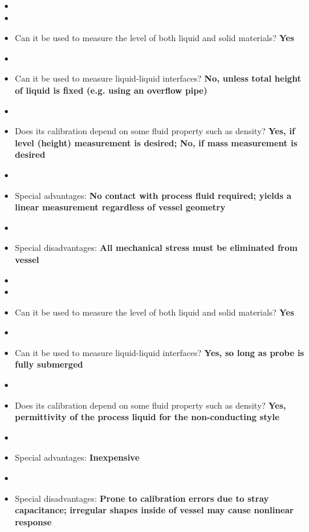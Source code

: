 \vskip 10pt

\begin{itemize}
\goodbreak
\item{} 
\item\item{} Can it be used to measure the level of both liquid and solid materials? {\bf Yes}
\item\item{} Can it be used to measure liquid-liquid interfaces? {\bf No, unless total height of liquid is fixed (e.g. using an overflow pipe)}
\item\item{} Does its calibration depend on some fluid property such as density? {\bf Yes, if level (height) measurement is desired; No, if mass measurement is desired}
\item\item{} Special advantages: {\bf No contact with process fluid required; yields a linear measurement regardless of vessel geometry}
\item\item{} Special disadvantages: {\bf All mechanical stress must be eliminated from vessel}
\end{itemize}

\vskip 10pt

\begin{itemize}
\goodbreak
\item{} 
\item\item{} Can it be used to measure the level of both liquid and solid materials? {\bf Yes}
\item\item{} Can it be used to measure liquid-liquid interfaces? {\bf Yes, so long as probe is fully submerged}
\item\item{} Does its calibration depend on some fluid property such as density? {\bf Yes, permittivity of the process liquid for the non-conducting style}
\item\item{} Special advantages: {\bf Inexpensive}
\item\item{} Special disadvantages: {\bf Prone to calibration errors due to stray capacitance; irregular shapes inside of vessel may cause nonlinear response}
\end{itemize}

